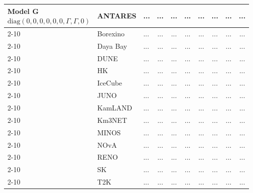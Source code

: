 \begin{table}[H]
{\begin{tabular}{|l|l|l||c|c|c|c|c|c|c|}
\multirow{3}{*}{\parbox{3.2cm}{\centering 
Model G \\[0.5ex]
\scriptsize $\mathrm{diag}(0, 0, 0, 0, 0, 0, \Gamma, \Gamma, 0)$}}
        & ANTARES          & ... & ... & ... & ... & ... & ... & ... & ... \\ \cline{2-10}
        & Borexino         & ... & ... & ... & ... & ... & ... & ... & ... \\ \cline{2-10}
        & Daya Bay         & ... & ... & ... & ... & ... & ... & ... & ... \\ \cline{2-10}
        & DUNE             & ... & ... & ... & ... & ... & ... & ... & ... \\ \cline{2-10}
        & HK & ... & ... & ... & ... & ... & ... & ... & ... \\ \cline{2-10}
        & IceCube          & ... & ... & ... & ... & ... & ... & ... & ... \\ \cline{2-10}
        & JUNO             & ... & ... & ... & ... & ... & ... & ... & ... \\ \cline{2-10}
        & KamLAND          & ... & ... & ... & ... & ... & ... & ... & ... \\ \cline{2-10}
        & Km3NET           & ... & ... & ... & ... & ... & ... & ... & ... \\ \cline{2-10}
        & MINOS            & ... & ... & ... & ... & ... & ... & ... & ... \\ \cline{2-10}
        & NOvA             & ... & ... & ... & ... & ... & ... & ... & ... \\ \cline{2-10}
        & RENO             & ... & ... & ... & ... & ... & ... & ... & ... \\ \cline{2-10}
        & SK               & ... & ... & ... & ... & ... & ... & ... & ... \\ \cline{2-10}
        & T2K              & ... & ... & ... & ... & ... & ... & ... & ... \\ \hline \hline

        
\end{tabular}
} %
\end{table}

\newpage


